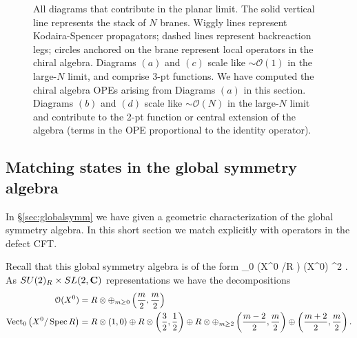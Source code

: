 \documentclass[../main.tex]{subfiles}
\begin{document}
\begin{figure}
\begin{tikzpicture}[scale={0.75}]
	\end{tikzpicture}
	\caption{All diagrams that contribute in the planar limit. The solid vertical line represents the stack of $N$ branes. Wiggly lines represent Kodaira-Spencer propagators; dashed lines represent backreaction legs; circles anchored on the brane represent local operators in the chiral algebra. Diagrams $(a)$ and $(c)$ scale like $\sim \mathcal{O}(1)$ in the large-$N$ limit, and comprise 3-pt functions. We have computed the chiral algebra OPEs arising from Diagrams $(a)$ in this section. Diagrams $(b)$ and $(d)$ scale like $\sim \mathcal{O}(N)$ in the  large-$N$ limit and contribute to the 2-pt function or central extension of the algebra (terms in the OPE proportional to the identity operator). \label{fig:alldiagramsplanar}}
\end{figure}


\subsection{Matching states in the global symmetry algebra}

In \S \ref{sec:globalsymm} we have given a geometric characterization of the global symmetry algebra.
In this short section we match explicitly with operators in the defect CFT.

Recall that this global symmetry algebra is of the form
\beqn
{}_0 \left(X^0 \slash \Spec R \right) \oplus \cO(X^0) \otimes \Pi \C^2 .
\eeqn
As $SU(2)_R \times SL(2,\C)$ representations we have the decompositions
\begin{align*}
\cO(X^0) & = R \otimes \oplus_{m \geq 0} \left(\frac{m}{2}, \frac{m}{2} \right) \\
\op{Vect}_0 \left(X^0 \slash \Spec R \right) & = R \otimes \left(1,0\right) \oplus R \otimes \left(\frac32, \frac12\right) \oplus R \otimes \oplus_{m \geq 2} \left(\frac{m-2}{2},\frac{m}2\right) \oplus \left(\frac{m+2}{2}, \frac{m}{2}\right) .
\end{align*}
\end{document}
